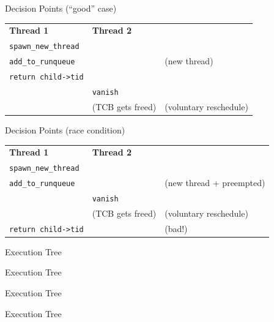\documentclass[xcolor=dvipsnames]{beamer}
\begin{document}

\begin{frame}{Decision Points (``good'' case)}
	\begin{tabular}{|l|l|l}
		\cline{1-2}
		{\bf Thread 1} & {\bf Thread 2} & \\
		\cline{1-2}
		\texttt{spawn\_new\_thread} && \\
		\cline{1-2}
		\texttt{add\_to\_runqueue} && (new thread) \\
		\cline{1-2}
		\texttt{return child->tid} &&  \\
		\cline{1-2}
		& \texttt{vanish} & \\
		\cline{1-2}
		& (TCB gets freed) & (voluntary reschedule) \\
		\cline{1-2}
	\end{tabular}
\end{frame}

\begin{frame}{Decision Points (race condition)}
	\begin{tabular}{|l|l|l}
		\cline{1-2}
		{\bf Thread 1} & {\bf Thread 2} & \\
		\cline{1-2}
		\texttt{spawn\_new\_thread} && \\
		\cline{1-2}
		\texttt{add\_to\_runqueue} && (new thread + preempted) \\
		\cline{1-2}
		& \texttt{vanish} & \\
		\cline{1-2}
		& (TCB gets freed) & (voluntary reschedule) \\
		\cline{1-2}
		\texttt{return child->tid} && (bad!) \\
		\cline{1-2}
	\end{tabular}
\end{frame}


\begin{frame}{Execution Tree}
	\begin{center}
	\end{center}
\end{frame}
\begin{frame}{Execution Tree}
	\begin{center}
	\end{center}
\end{frame}
\begin{frame}{Execution Tree}
	\begin{center}
	\end{center}
\end{frame}
\begin{frame}{Execution Tree}
	\begin{center}
	\end{center}
\end{frame}
\end{document}
